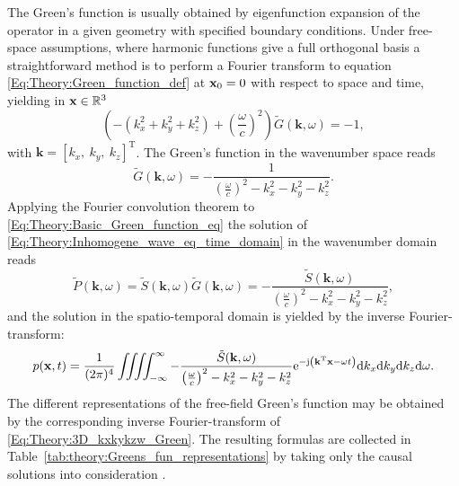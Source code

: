 The Green's function is usually obtained by eigenfunction expansion of the operator in a given geometry with specified boundary conditions. 
Under free-space assumptions, where harmonic functions give a full orthogonal basis a straightforward method is to perform a Fourier transform to equation \eqref{Eq:Theory:Green_function_def} at $\mathbf{x}_0 = 0$ with respect to space and time, yielding in $\mathbf{x} \in \mathbb{R}^{3}$
\begin{equation}
(-(k_x^2 + k_y^2 + k_z^2) + \left(\frac{\omega}{c} \right)^2)\tilde{G}(\mathbf{k},\omega) = -1,
\end{equation}
with $\mathbf{k} = [k_x,\ k_y,\ k_z]^{\mathrm{T}}$.
The Green's function in the wavenumber space reads \cite{Devaney2012, Watanabe2015}
\begin{equation}
\tilde{G}(\mathbf{k},\omega) = -\frac{1}{\left( \frac{\omega}{c}\right)^2 -  k_x^2 - k_y^2 - k_z^2 }.
\label{Eq:Theory:3D_kxkykzw_Green}
\end{equation}
Applying the Fourier convolution theorem to \eqref{Eq:Theory:Basic_Green_function_eq} the solution of \eqref{Eq:Theory:Inhomogene_wave_eq_time_domain} in the wavenumber domain reads
\begin{equation}
\tilde{P}(\mathbf{k},\omega)  = \tilde{S}(\mathbf{k},\omega) \tilde{G}(\mathbf{k},\omega) = -\frac{\tilde{S}(\mathbf{k},\omega)}{\left( \frac{\omega}{c}\right)^2 -  k_x^2 - k_y^2 - k_z^2 },
\end{equation}
and the solution in the spatio-temporal domain is yielded by the inverse Fourier-transform:
\begin{equation}
p(\mathbf{x},t) =\frac{1}{(2\pi)^4} \iiiint^{\infty}_{-\infty} - \frac{\tilde{S}(\mathbf{k},\omega)}{\left( \frac{\omega}{c}\right)^2 -  k_x^2 - k_y^2 - k_z^2 } \mathrm{e}^{-\mathrm{j} \left( \mathbf{k}^{\mathrm{T}}\mathbf{x} - \omega t \right) } \mathrm{d} k_x \mathrm{d} k_y \mathrm{d} k_z \mathrm{d} \omega.
\end{equation}
The different representations of the free-field Green's function may be obtained by the corresponding inverse Fourier-transform of \eqref{Eq:Theory:3D_kxkykzw_Green}.
The resulting formulas are collected in Table\ \ref{tab:theory:Greens_fun_representations} by taking only the causal solutions into consideration	.

